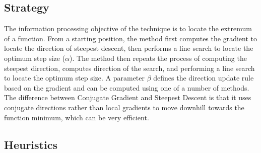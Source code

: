 \subsection{Strategy}
The information processing objective of the technique is to locate the extremum of a function.
From a starting position, the method first computes the gradient to locate the direction of steepest descent, then performs a line search to locate the optimum step size ($\alpha$). The method then repeats the process of computing the steepest direction, computes direction of the search, and performing a line search to locate the optimum step size. A parameter $\beta$ defines the direction update rule based on the gradient and can be computed using one of a number of methods.
The difference between Conjugate Gradient and Steepest Descent is that it uses conjugate directions rather than local gradients to move downhill towards the function minimum, which can be very efficient.

\subsection{Heuristics}

